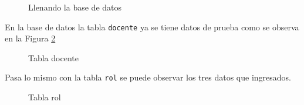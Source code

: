  \begin{figure}[H]
\caption{Llenando la base de datos}\label{fig:populating}
\centering
{}
\end{figure}
En la base de datos la tabla \texttt{docente} ya se tiene datos de prueba como se observa en la Figura \ref{fig:tableDocente}
\begin{figure}[H]
\caption{Tabla docente}\label{fig:tableDocente}
\centering
{}
\end{figure}
Pasa lo mismo con la tabla \texttt{rol} se puede observar los tres datos que ingresados.
\begin{figure}[H]
\caption{Tabla rol}\label{fig:tableRol}
\centering
{}
\end{figure}
